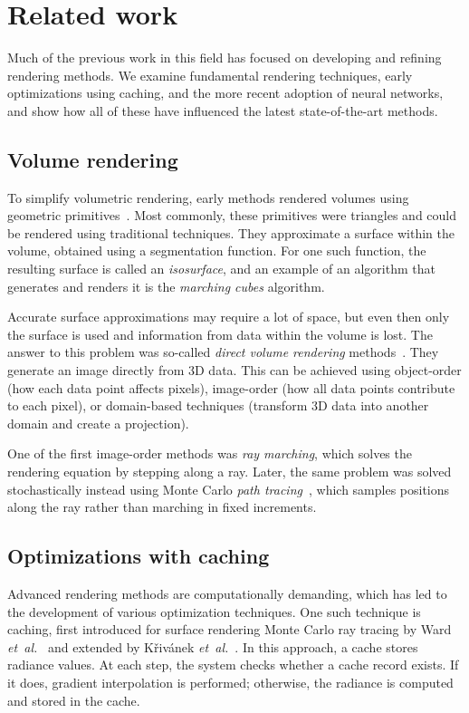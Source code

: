 \chapter{Related work}
\label{ch:related_work}

Much of the previous work in this field has focused on developing and refining
rendering methods. We examine fundamental rendering techniques, early
optimizations using caching, and the more recent adoption of neural networks,
and show how all of these have influenced the latest state-of-the-art methods.

\section{Volume rendering}

To simplify volumetric rendering, early methods rendered volumes using
geometric primitives~\cite[Section~7.3]{kaufman_7_2005}. Most commonly, these
primitives were triangles and could be rendered using traditional techniques.
They approximate a surface within the volume, obtained using a segmentation
function. For one such function, the resulting surface is called an
\emph{isosurface}, and an example of an algorithm that generates and renders
it is the \emph{marching cubes} algorithm.

Accurate surface approximations may require a lot of space, but even then only
the surface is used and information from data within the volume is lost. The
answer to this problem was so-called \emph{direct volume rendering}
methods~\cite[Section~4]{kaufman_43_2000}. They generate an image directly
from 3D data. This can be achieved using object-order (how each data point
affects pixels), image-order (how all data points contribute to each pixel),
or domain-based techniques (transform 3D data into another domain and create
a projection).

One of the first image-order methods was \emph{ray marching}, which solves the
rendering equation by stepping along a ray. Later, the same problem was solved
stochastically instead using Monte Carlo
\emph{path tracing}~\cite{fong_production_2017}, which samples positions along
the ray rather than marching in fixed increments.

\section{Optimizations with caching}

Advanced rendering methods are computationally demanding, which has led to
the development of various optimization techniques. One such technique is
caching, first introduced for surface rendering Monte Carlo ray tracing by
Ward \emph{et~al.}~\cite{ward_ray_1988} and extended by
K\v{r}iv{\'a}nek \emph{et~al.}~\cite{krivanek_radiance_2008}. In this approach,
a cache stores radiance values. At each step, the system checks whether a cache
record exists. If it does, gradient interpolation is performed; otherwise, the
radiance is computed and stored in the cache.

